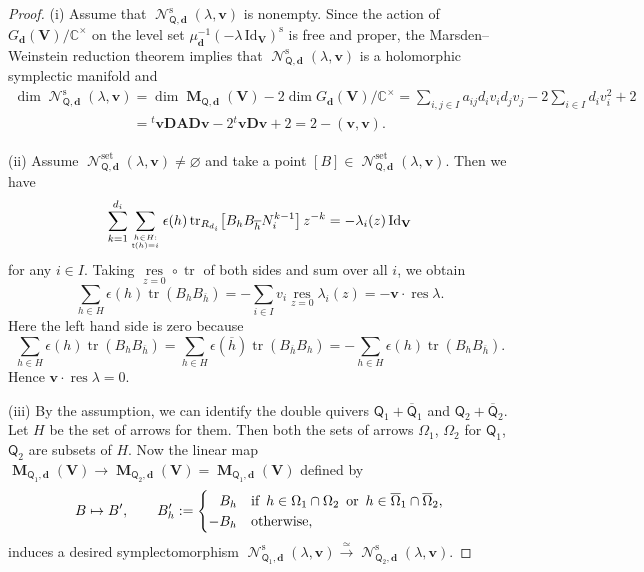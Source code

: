 \documentclass[pdftex]{sigma}
\numberwithin{equation}{section}
\theoremstyle{definition}
\newcommand{\C}{\mathbb{C}} %
\newcommand{\tr}{\operatorname{tr}}
\newcommand{\unit}{\mathrm{Id}}
\newcommand{\bM}{\operatorname{\mathbf{M}}}
\newcommand{\bA}{\mathbf{A}} %
\newcommand{\bD}{\mathbf{D}} %
\newcommand{\bV}{\mathbf{V}}
\newcommand{\bv}{\mathbf{v}}
\newcommand{\ov}{\overline}
\newcommand{\res}{\operatorname*{res}}
\newcommand{\ved}{\mathbf{d}}
\newcommand{\st}{\mathrm{s}}
\newcommand{\sumfrac}[2]{\genfrac{}{}{0pt}{2}{#1}{#2}}
\newcommand{\hquad}{\hspace{.5em}}
\newcommand{\Qst}{\operatorname{\mathscr{N}}^\mathrm{s}}
\newcommand{\Qset}{\operatorname{\mathscr{N}}^\mathrm{set}}
\newcommand{\vin}{\mathsf{t}} %
\newcommand{\QQ}{\mathsf{Q}} %
\begin{document}
\begin{proof}
(i) Assume that $\Qst_{\QQ,\ved}(\lambda,\bv)$ is nonempty.
Since the action of $G_\ved(\bV)/\C^\times$
on the level set $\mu_\ved^{-1}(-\lambda\,\unit_\bV)^\st$ is free and proper,
the Marsden--Weinstein reduction theorem implies that
$\Qst_{\QQ,\ved}(\lambda,\bv)$ is a holomorphic symplectic manifold and
\begin{gather*}
\dim \Qst_{\QQ,\ved}(\lambda,\bv)  =
\dim \bM_{\QQ,\ved}(\bV) - 2 \dim G_\ved(\bV)/\C^\times
 = \sum_{i,j\in I} a_{ij} d_i v_i d_j v_j -2 \sum_{i \in I} d_i v_i^2 + 2 \\
\phantom{\dim \Qst_{\QQ,\ved}(\lambda,\bv)} = {}^t \bv \bD \bA \bD \bv -2 {}^t \bv \bD \bv +2 = 2-(\bv, \bv).
\end{gather*}

(ii) Assume $\Qset_{\QQ,\ved}(\lambda,\bv) \neq \varnothing$
and take a point $[B] \in \Qset_{\QQ,\ved}(\lambda,\bv)$.
Then we have
\[
\sum_{k=1}^{d_i} \sum_{\sumfrac{h \in H:}{\vin(h)=i}}
\epsilon(h) \tr_{R_{d_i}}
\bigl[ B_h B_{\ov{h}} N_i^{k-1} \bigr]\, z^{-k} = -\lambda_i(z)\,\unit_\bV
\]
for any $i \in I$.
Taking $\res\limits_{z=0} \circ \tr$ of both sides and sum over all $i$,
we obtain
\[
\sum_{h \in H} \epsilon(h) \tr ( B_h B_{\ov{h}} )
= -\sum_{i \in I} v_i \res_{z=0} \lambda_i(z) = -\bv \cdot \res \lambda.
\]
Here the left hand side is zero because
\[
\sum_{h \in H} \epsilon(h) \tr ( B_h B_{\ov{h}} ) =
\sum_{h \in H} \epsilon(\ov h) \tr ( B_{\ov{h}}B_h ) =
-\sum_{h \in H} \epsilon(h) \tr ( B_h B_{\ov{h}} ).
\]
Hence $\bv \cdot \res \lambda =0$.

(iii) By the assumption, we can identify the double quivers
$\QQ_1 + \ov{\QQ}_1$ and $\QQ_2 + \ov{\QQ}_2$.
Let $H$ be the set of arrows for them.
Then both the sets of arrows $\Omega_1$, $\Omega_2$ for $\QQ_1$, $\QQ_2$
are subsets of $H$.
Now the linear map
$\bM_{\QQ_1,\ved}(\bV) \to \bM_{\QQ_2,\ved}(\bV)=\bM_{\QQ_1,\ved}(\bV)$
def\/ined by
\[
B \mapsto B', \qquad B'_h:=
\begin{cases}
\hphantom{-}B_h &
\text{if}\hquad h \in \Omega_1 \cap \Omega_2
\hquad\text{or}\hquad h \in \ov{\Omega}_1 \cap \ov{\Omega}_2,
\\
-B_h & \text{otherwise},
\end{cases}
\]
induces a desired symplectomorphism
$\Qst_{\QQ_1,\ved}(\lambda,\bv) \xrightarrow{\simeq}
\Qst_{\QQ_2,\ved}(\lambda,\bv)$.
\end{proof}
\end{document}
